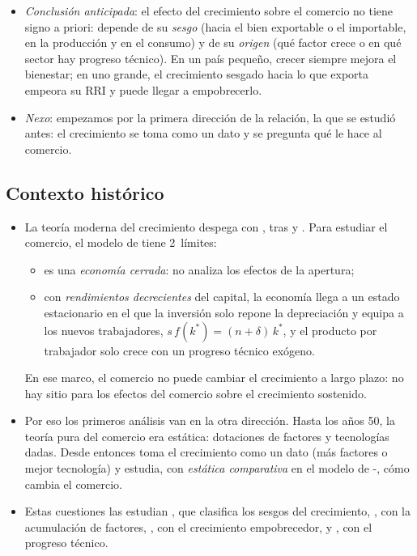 \documentclass[11pt]{article}
\begin{document}
\begin{itemize}
\item \emph{Conclusión anticipada}: el efecto del crecimiento sobre el comercio no tiene signo a priori: depende de su \emph{sesgo} (hacia el bien exportable o el importable, en la producción y en el consumo) y de su \emph{origen} (qué factor crece o en qué sector hay progreso técnico). En un país pequeño, crecer siempre mejora el bienestar; en uno grande, el crecimiento sesgado hacia lo que exporta empeora su RRI y puede llegar a empobrecerlo.
\item \emph{Nexo}: empezamos por la primera dirección de la relación, la que se estudió antes: el crecimiento se toma como un dato y se pregunta qué le hace al comercio.
\end{itemize}

\subsection{Contexto histórico}\label{sec:contexto}

\begin{itemize}
\item La teoría moderna del crecimiento despega con \textcite{Solow1956}, tras \textcite{Harrod1939} y \textcite{Domar1946} . Para estudiar el comercio, el modelo de  tiene 2~límites:
  \begin{itemize}
  \item es una \emph{economía cerrada}: no analiza los efectos de la apertura;
  \item con \emph{rendimientos decrecientes} del capital, la economía llega a un estado estacionario en el que la inversión solo repone la depreciación y equipa a los nuevos trabajadores, $s\,f(k^*)=(n+\delta)\,k^*$, y el producto por trabajador solo crece con un progreso técnico exógeno.
  \end{itemize}
  En ese marco, el comercio no puede cambiar el crecimiento a largo plazo: no hay sitio para los efectos del comercio sobre el crecimiento sostenido.
\item Por eso los primeros análisis van en la otra dirección. Hasta los años 50, la teoría pura del comercio era estática: dotaciones de factores y tecnologías dadas. Desde entonces toma el crecimiento como un dato (más factores o mejor tecnología) y estudia, con \emph{estática comparativa} en el modelo de -, cómo cambia el comercio.
\item Estas cuestiones las estudian \textcite{Johnson1955Economic,Johnson1958International}, que clasifica los sesgos del crecimiento, \textcite{Rybczynski1955Factor}, con la acumulación de factores, \textcite{Bhagwati1958Immiserizing}, con el crecimiento empobrecedor, y \textcite{FindlayGrubert1959Factor}, con el progreso técnico.
\end{itemize}
\end{document}

